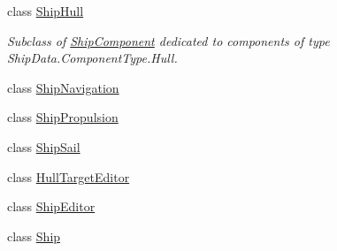 \begin{DoxyCompactItemize}
class \hyperlink{class_skyrates_1_1_client_1_1_ship_1_1_ship_hull}{Ship\-Hull}
\begin{DoxyCompactList}\small\item\em Subclass of \hyperlink{class_skyrates_1_1_client_1_1_ship_1_1_ship_component}{Ship\-Component} dedicated to components of type Ship\-Data.\-Component\-Type.\-Hull. \end{DoxyCompactList}\item 
class \hyperlink{class_skyrates_1_1_client_1_1_ship_1_1_ship_navigation}{Ship\-Navigation}
\item 
class \hyperlink{class_skyrates_1_1_client_1_1_ship_1_1_ship_propulsion}{Ship\-Propulsion}
\item 
class \hyperlink{class_skyrates_1_1_client_1_1_ship_1_1_ship_sail}{Ship\-Sail}
\item 
class \hyperlink{class_skyrates_1_1_client_1_1_ship_1_1_hull_target_editor}{Hull\-Target\-Editor}
\item 
class \hyperlink{class_skyrates_1_1_client_1_1_ship_1_1_ship_editor}{Ship\-Editor}
\item 
class \hyperlink{class_skyrates_1_1_client_1_1_ship_1_1_ship}{Ship}
\end{DoxyCompactItemize}
